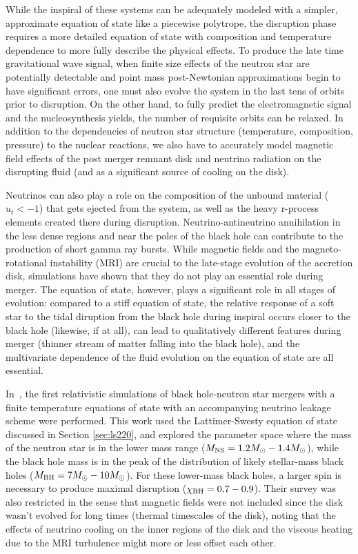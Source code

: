 While the inspiral of these systems can be adequately modeled with a simpler, approximate equation of state like a piecewise polytrope, the disruption phase requires a more detailed equation of state with composition and temperature dependence to more fully describe the physical effects.  
To produce the late time gravitational wave signal, when finite size effects of the neutron star are potentially detectable and point mass post-Newtonian approximations begin to have significant errors, one must also evolve the system in the last tens of orbits prior to disruption.  
On the other hand, to fully predict the electromagnetic signal and the nucleosynthesis yields, the number of requisite orbits can be relaxed.  
In addition to the dependencies of neutron star structure (temperature, composition, pressure) to the nuclear reactions, we also have to accurately model magnetic field effects of the post merger remnant disk and neutrino radiation on the disrupting fluid (and as a significant source of cooling on the disk).

Neutrinos can also play a role on the composition of the unbound material ($u_t < -1$) that gets ejected from the system, as well as the heavy r-process elements created there during disruption. 
Neutrino-antineutrino annihilation in the less dense regions and near the poles of the black hole can contribute to the production of short gamma ray bursts.  
While magnetic fields and the magneto-rotational instability (MRI) are crucial to the late-stage evolution of the accretion disk, simulations have shown that they do not play an essential role during merger.  
The equation of state, however, plays a significant role in all stages of evolution: compared to a stiff equation of state, the relative response of a soft star to the tidal diruption from the black hole during inspiral occurs closer to the black hole (likewise, if at all), can lead to qualitatively different features during merger (thinner stream of matter falling into the black hole), and the multivariate dependence of the fluid evolution on the equation of state are all essential.

In~\cite{Foucart:2014nda}, the first relativistic simulations of black hole-neutron star mergers with a finite temperature equations of state with an accompanying neutrino leakage scheme were performed.  
This work used the Lattimer-Swesty equation of state discussed in Section \ref{sec:ls220}, and explored the parameter space where the mass of the neutron star is in the lower mass range ($M_{\rm NS} = 1.2 M_\odot - 1.4 M_\odot$), while the black hole mass is in the peak of the distribution of likely stellar-mass black holes ($M_{\rm BH} = 7 M_\odot - 10 M_\odot$). 
For these lower-mass black holes, a larger spin is necessary to produce maximal disruption ($\chi_{\rm BH} = 0.7 - 0.9$).  
Their survey was also restricted in the sense that magnetic fields were not included since the disk wasn't evolved for long times (thermal timescales of the disk), noting that the effects of neutrino cooling on the inner regions of the disk and the viscous heating due to the MRI turbulence might more or less offset each other.

